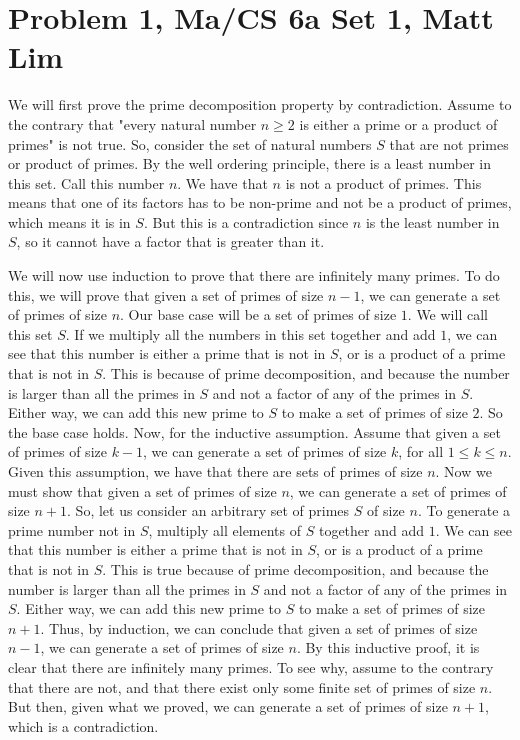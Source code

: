 \documentclass{article}
\begin{document}
\section*{Problem 1, Ma/CS 6a Set 1, Matt Lim}
We will first prove the prime decomposition property by contradiction.
Assume to the contrary that "every natural number $n \geq 2$ is either a prime or
a product of primes" is not true. So, consider the set of natural numbers $S$
that are not primes or product of primes. By the well ordering principle,
there is a least number in this set. Call this number $n$. We have that $n$
is not a product of primes. This means that one of its factors has to be
non-prime and not be a product of primes, which means it is in $S$. But this
is a contradiction since $n$ is the least number in $S$, so it cannot have
a factor that is greater than it.

We will now use induction to prove that there are infinitely many primes.
To do this, we will prove that given a set of primes of size $n-1$, we can generate
a set of primes of size $n$.
Our base case will be a set of primes of size $1$. We will call this set
$S$. If we multiply all the numbers
in this set together and add $1$, we can see that this number is either a prime
that is not in $S$, or is a product of a prime that is not in $S$.
This is because of prime decomposition, and because the number is larger
than all the primes in $S$ and not a factor of any of the primes in $S$. Either way,
we can add this new prime to $S$ to make a set of primes of size $2$. So the base
case holds. Now, for the inductive assumption. Assume that given a set of
primes of size $k-1$, we can generate a set of primes of size $k$,
for all $1 \leq k \leq n$. Given this assumption, we have that there are sets of primes
of size $n$. Now we must show that given a set of primes of size $n$, we can
generate a set of primes of size $n+1$. So, let us consider an arbitrary set of
primes $S$ of size $n$. To generate a prime number not in $S$, multiply all
elements of $S$ together and add $1$. We can see that this number is either a
prime that is not in $S$, or is a product of a prime that is not in $S$. This
is true because of prime decomposition, and because the number is larger than
all the primes in $S$ and not a factor of any of the primes in $S$. Either way,
we can add this new prime to $S$ to make a set of primes of size $n+1$.
Thus, by induction, we can conclude that given a set of primes of size $n-1$, we
can generate a set of primes of size $n$. By this inductive proof, it is clear
that there are infinitely many primes. To see why, assume to the contrary that there
are not, and that there exist only some finite set of primes of size $n$. But then,
given what we proved, we can generate a set of primes of size $n+1$, which is
a contradiction.
\newpage
\end{document}

